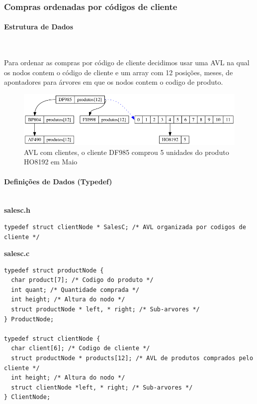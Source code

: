 \documentclass[10pt] {article}
\begin{document}
\newpage
\subsubsection{Compras ordenadas por códigos de cliente}
\paragraph{Estrutura de Dados}\mbox{}\\
\indent\par Para ordenar as compras por código de cliente decidimos usar uma AVL na qual os nodos contem
o código de cliente e um array com 12 posições, meses, de apontadores para árvores em que os nodos
contem o codigo de produto.

\begin{figure}[ht!]
\centering
\includegraphics[width=120mm]{avl_salesc.png}
\caption{AVL com clientes, o cliente DF985 comprou 5 unidades do produto HO8192 em Maio}
\end{figure}

\paragraph{Definições de Dados (Typedef)}\mbox{}\\
\noindent\textbf{salesc.h}
\begin{lstlisting}
typedef struct clientNode * SalesC; /* AVL organizada por codigos de cliente */
\end{lstlisting}
\textbf{salesc.c}
\begin{lstlisting}
typedef struct productNode {
  char product[7]; /* Codigo do produto */
  int quant; /* Quantidade comprada */
  int height; /* Altura do nodo */
  struct productNode * left, * right; /* Sub-arvores */
} ProductNode;

typedef struct clientNode {
  char client[6]; /* Codigo de cliente */
  struct productNode * products[12]; /* AVL de produtos comprados pelo cliente */
  int height; /* Altura do nodo */
  struct clientNode *left, * right; /* Sub-arvores */
} ClientNode;
\end{lstlisting}
\end{document}
